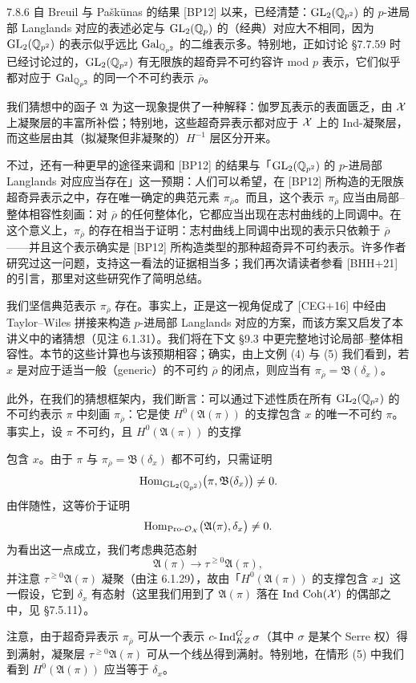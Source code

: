 \begin{rem}{7.8.6}\label{rem:a4-7-8-6}
自 Breuil 与 Paškūnas 的结果 [BP12] 以来，已经清楚：$\mathrm{GL}_2(\mathbb{Q}_{p^2})$ 的 $p$-进局部 Langlands 对应的表述必定与 $\mathrm{GL}_2(\mathbb{Q}_p)$ 的（经典）对应大不相同，因为 $\mathrm{GL}_2(\mathbb{Q}_{p^2})$ 的表示似乎远比 $\operatorname{Gal}_{\mathbb{Q}_{p^2}}$ 的二维表示多。特别地，正如讨论 §7.7.59 时已经讨论过的，$\mathrm{GL}_2(\mathbb{Q}_{p^2})$ 有无限族的超奇异不可约容许 mod $p$ 表示，它们似乎都对应于 $\operatorname{Gal}_{\mathbb{Q}_{p^2}}$ 的同一个不可约表示 $\overline{\rho}$。

我们猜想中的函子 $\mathfrak A$ 为这一现象提供了一种解释：伽罗瓦表示的表面匮乏，由 $\mathcal{X}$ 上凝聚层的丰富所补偿；特别地，这些超奇异表示都对应于 $\mathcal{X}$ 上的 Ind-凝聚层，而这些层由其（拟凝聚但非凝聚的）$H^{-1}$ 层区分开来。

不过，还有一种更早的途径来调和 [BP12] 的结果与「$\mathrm{GL}_2(\mathbb{Q}_{p^2})$ 的 $p$-进局部 Langlands 对应应当存在」这一预期：人们可以希望，在 [BP12] 所构造的无限族超奇异表示之中，存在唯一确定的典范元素 $\pi_{\overline{\rho}}$。而且，这个表示 $\pi_{\overline{\rho}}$ 应当由局部--整体相容性刻画：对 $\overline{\rho}$ 的任何整体化，它都应当出现在志村曲线的上同调中。在这个意义上，$\pi_{\overline{\rho}}$ 的存在相当于证明：志村曲线上同调中出现的表示只依赖于 $\overline{\rho}$——并且这个表示确实是 [BP12] 所构造类型的那种超奇异不可约表示。许多作者研究过这一问题，支持这一看法的证据相当多；我们再次请读者参看 [BHH+21] 的引言，那里对这些研究作了简明总结。

我们坚信典范表示 $\pi_{\overline{\rho}}$ 存在。事实上，正是这一视角促成了 [CEG+16] 中经由 Taylor--Wiles 拼接来构造 $p$-进局部 Langlands 对应的方案，而该方案又启发了本讲义中的诸猜想（见注 6.1.31）。我们将在下文 §9.3 中更完整地讨论局部--整体相容性。本节的这些计算也与该预期相容；确实，由上文例 (4) 与 (5) 我们看到，若 $x$ 是对应于适当一般（generic）的不可约 $\overline{\rho}$ 的闭点，则应当有 $\pi_{\overline{\rho}}=\mathfrak B(\delta_x)$。

此外，在我们的猜想框架内，我们断言：可以通过下述性质在所有 $\mathrm{GL}_2(\mathbb{Q}_{p^2})$ 的不可约表示 $\pi$ 中刻画 $\pi_{\overline{\rho}}$：它是使 $H^0(\mathfrak A(\pi))$ 的支撑包含 $x$ 的唯一不可约 $\pi$。事实上，设 $\pi$ 不可约，且 $H^0(\mathfrak A(\pi))$ 的支撑

包含 $x$。由于 $\pi$ 与 $\pi_{\overline{\rho}}=\mathfrak B(\delta_x)$ 都不可约，只需证明
\[
\operatorname{Hom}_{\mathrm{GL}_2(\mathbb{Q}_{p^2})}\bigl(\pi,\mathfrak B(\delta_x)\bigr)\neq0.
\]
由伴随性，这等价于证明
\[
\operatorname{Hom}_{\mathrm{Pro}\text{-}\mathcal{O}_{\mathcal{X}}}\bigl(\mathfrak A(\pi),\delta_x\bigr)\neq0.
\]
为看出这一点成立，我们考虑典范态射
\[
\mathfrak A(\pi)\to\tau^{\ge0}\mathfrak A(\pi),
\]
并注意 $\tau^{\ge0}\mathfrak A(\pi)$ 凝聚（由注 6.1.29），故由「$H^0(\mathfrak A(\pi))$ 的支撑包含 $x$」这一假设，它到 $\delta_x$ 有态射（这里我们用到了 $\mathfrak A(\pi)$ 落在 $\operatorname{Ind}\,\operatorname{Coh}(\mathcal{X})$ 的偶部之中，见 §7.5.11）。

注意，由于超奇异表示 $\pi_{\overline{\rho}}$ 可从一个表示 $c\text{-}\operatorname{Ind}_{KZ}^G\sigma$（其中 $\sigma$ 是某个 Serre 权）得到满射，凝聚层 $\tau^{\ge0}\mathfrak A(\pi)$ 可从一个线丛得到满射。特别地，在情形 (5) 中我们看到 $H^0(\mathfrak A(\pi))$ 应当等于 $\delta_x$。
\end{rem}

